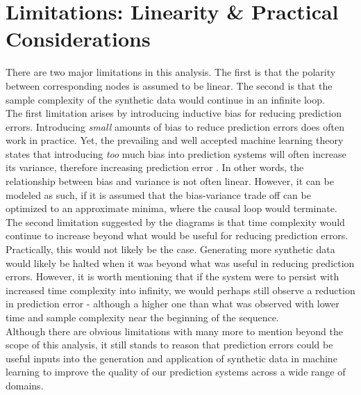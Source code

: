 \documentclass{article}
\begin{document}
\newpage
\section*{Limitations: Linearity \& Practical Considerations}
There are two major limitations in this analysis. The first is that the polarity between corresponding nodes is assumed to be linear. The second is that the sample complexity of the synthetic data would continue in an infinite loop. \\

The first limitation arises by introducing inductive bias for reducing prediction errors. Introducing \textit{small} amounts of bias to reduce prediction errors does often work in practice. Yet, the prevailing and well accepted machine learning theory states that introducing \textit{too} much bias into prediction systems will often increase its variance, therefore increasing prediction error \cite{James2013}. In other words, the relationship between bias and variance is not often linear. However, it can be modeled as such, if it is assumed that the bias-variance trade off can be optimized to an approximate minima, where the causal loop would terminate. \\

The second limitation suggested by the diagrams is that time complexity would continue to increase beyond what would be useful for reducing prediction errors. Practically, this would not likely be the case. Generating more synthetic data would likely be halted when it was beyond what was useful in reducing prediction errors. However, it is worth mentioning that if the system were to persist with increased time complexity into infinity, we would perhaps still observe a reduction in prediction error - although a higher one than what was observed with lower time and sample complexity near the beginning of the sequence. \\

Although there are obvious limitations with many more to mention beyond the scope of this analysis, it still stands to reason that prediction errors could be useful inputs into the generation and application of synthetic data in machine learning to improve the quality of our prediction systems across a wide range of domains.

\newpage


\end{document}
